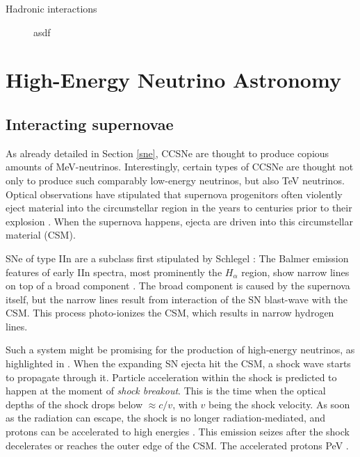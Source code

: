 \documentclass[
    a4paper, %
    fontsize=10pt, %
    twoside=false, %
    numbers=noenddot, %
    fontmethod=tex,
]{kaobook}
\begin{document}
\begin{description}
    \item[Hadronic interactions] asdf
\end{description}

\section{High-Energy Neutrino Astronomy}
\subsection{Interacting supernovae}
As already detailed in Section \ref{sne}, CCSNe are thought to produce copious amounts of \unit{\mega\eV}-neutrinos. Interestingly, certain types of CCSNe are thought not only to produce such comparably low-energy neutrinos, but also \unit{\tera\eV} neutrinos. Optical observations have stipulated that supernova progenitors often violently eject material into the circumstellar region in the years to centuries prior to their explosion . When the supernova happens, ejecta are driven into this circumstellar material (CSM).

SNe of type IIn are a subclass first stipulated by Schlegel : The Balmer emission features of early IIn spectra, most prominently the $H_\alpha$ region, show narrow lines on top of a broad component . The broad component is caused by the supernova itself, but the narrow lines result from interaction of the SN blast-wave with the CSM. This process photo-ionizes the CSM, which results in narrow hydrogen lines.

Such a system might be promising for the production of high-energy neutrinos, as highlighted in . When the expanding SN ejecta hit the CSM, a shock wave starts to propagate through it. Particle acceleration within the shock is predicted to happen at the moment of \textit{shock breakout}. This is the time when the optical depths of the shock drops below $\approx c/v$, with $v$ being the shock velocity. As soon as the radiation can escape, the shock is no longer radiation-mediated, and protons can be accelerated to high energies . This emission seizes after the shock decelerates or reaches the outer edge of the CSM. The accelerated protons \unit{\peta\eV} .


% 
% 
% 
\end{document}
